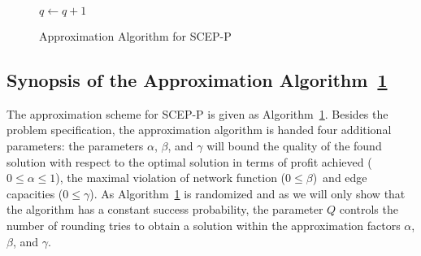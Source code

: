 \documentclass[10pt, conference, letterpaper]{IEEEtran}
\begin{document}
\begin{figure}
\begin{algorithm*}[H]
{{{		}
	


	}
		
	$q \gets q +1$\\
}
\KwRet{\NULL}
\caption{Approximation Algorithm for SCEP-P}
\label{alg:approxAdmissionControl}
\end{algorithm*}

\endgroup
\end{figure}



\subsection{Synopsis of the Approximation Algorithm~\ref{alg:approxAdmissionControl}}
\label{sec:synopsis-admission-control}
The approximation scheme for SCEP-P is given as Algorithm~\ref{alg:approxAdmissionControl}. Besides the problem specification, the approximation algorithm is handed four additional parameters: the parameters $\alpha$, $\beta$, and $\gamma$ will bound the quality of the found solution with respect to the optimal solution in terms of profit achieved ($0 \leq \alpha \leq 1$), the maximal violation of network function ($0 \leq \beta$)~and edge capacities ($0 \leq \gamma$). As Algorithm~\ref{alg:approxAdmissionControl} is randomized and as we will only show that the algorithm has a constant success probability, the parameter $Q$ controls the number of rounding tries to obtain a solution within the approximation factors $\alpha$, $\beta$, and $\gamma$.
\end{document}
